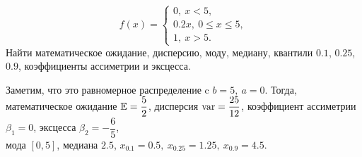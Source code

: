 \documentclass[12pt]{report}
\begin{document}
\[
    f(x) = \left\{
        \begin{array}{c}
            0, \ x < 5,\\
            0.2x, \ 0 \leq x \leq 5,\\
            1, \ x > 5.
        \end{array}
     \right.  
\]
Найти математическое ожидание, дисперсию, моду, медиану, квантили $0.1$, $0.25$, $0.9$, коэффициенты ассиметрии и эксцесса.
\begin{solution}
    Заметим, что это равномерное распределение c $b = 5, \ a = 0$. 
    Тогда, математическое ожидание $\mathbb{E} = \dfrac{5}{2}$, дисперсия $\operatorname{var} = \dfrac{25}{12}$, коэффициент ассиметрии $\beta_1 = 0$, эксцесса $\beta_2 = -\dfrac{6}{5}$, \\ мода $[0,5]$, медиана $2.5$, $x_{0.1} = 0.5, \ x_{0.25} = 1.25, \ x_{0.9} = 4.5.$
\end{solution}
\end{document}
